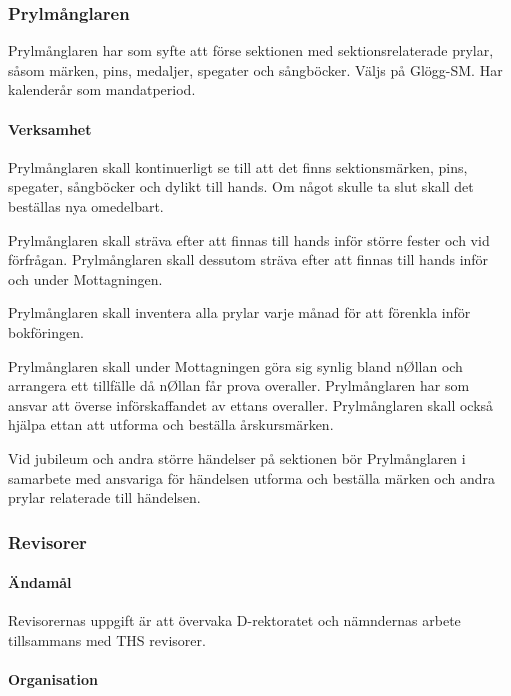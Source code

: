 \documentclass{dgovdoc}
\begin{document}
\subsubsection{Prylmånglaren}

Prylmånglaren har som syfte att förse sektionen med sektionsrelaterade prylar,
såsom märken, pins, medaljer, spegater och sångböcker. Väljs på Glögg-SM. Har
kalenderår som mandatperiod.

\paragraph{Verksamhet}

Prylmånglaren skall kontinuerligt se till att det finns sektionsmärken, pins,
spegater, sångböcker och dylikt till hands. Om något skulle ta slut skall det
beställas nya omedelbart.

Prylmånglaren skall sträva efter att finnas till hands inför större fester och
vid förfrågan. Prylmånglaren skall dessutom sträva efter att finnas till hands
inför och under Mottagningen.

Prylmånglaren skall inventera alla prylar varje månad för att förenkla inför
bokföringen.

Prylmånglaren skall under Mottagningen göra sig synlig bland nØllan och
arrangera ett tillfälle då nØllan får prova overaller. Prylmånglaren har som
ansvar att överse införskaffandet av ettans overaller. Prylmånglaren skall
också hjälpa ettan att utforma och beställa årskursmärken.

Vid jubileum och andra större händelser på sektionen bör Prylmånglaren i
samarbete med ansvariga för händelsen utforma och beställa märken och andra
prylar relaterade till händelsen.

\subsubsection{Revisorer}

\paragraph{Ändamål}

Revisorernas uppgift är att övervaka D-rektoratet och nämndernas arbete
tillsammans med THS revisorer.

\paragraph{Organisation}
\end{document}
